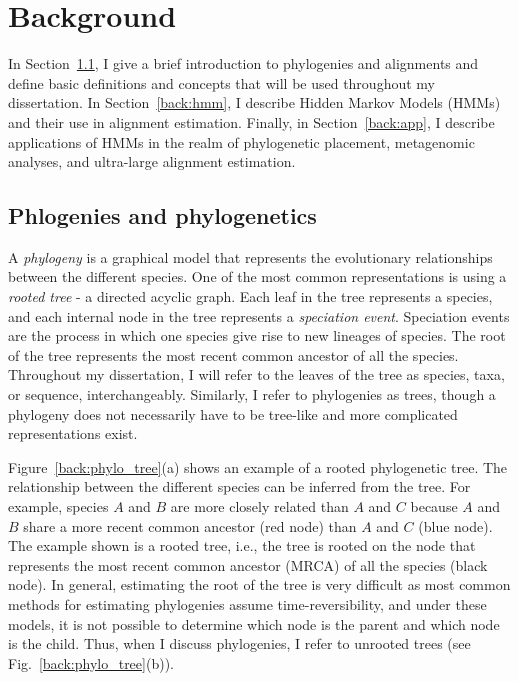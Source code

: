 \chapter{Background}
\label{background}%
In Section~\ref{back:phylogenetics}, I give a brief introduction to phylogenies and alignments and define basic definitions and concepts that will be used throughout my dissertation.  In Section~\ref{back:hmm}, I describe Hidden Markov Models (HMMs) and their use in alignment estimation. Finally, in Section~\ref{back:app}, I describe applications of HMMs in the realm of phylogenetic placement, metagenomic analyses, and ultra-large alignment estimation.

\section{Phlogenies and phylogenetics}\label{back:phylogenetics}
A \emph{phylogeny} is a graphical model that represents the evolutionary relationships between the different species.  One of the most common representations is using a \emph{rooted tree} - a directed acyclic graph.  Each leaf in the tree represents a species, and each internal node in the tree represents a \emph{speciation event}.  Speciation events are the process in which one species give rise to new lineages of species.  The root of the tree represents the most recent common ancestor of all the species.  Throughout my dissertation, I will refer to the leaves of the tree as species, taxa, or sequence, interchangeably.  Similarly, I refer to phylogenies as trees, though a phylogeny does not necessarily have to be tree-like and more complicated representations exist.

Figure~\ref{back:phylo_tree}(a) shows an example of a rooted phylogenetic tree.  The relationship between the different species can be inferred from the tree.  For example, species $A$ and $B$ are more closely related than $A$ and $C$ because $A$ and $B$ share a more recent common ancestor (red node) than $A$ and $C$ (blue node). The example shown is a rooted tree, i.e., the tree is rooted on the node that represents the most recent common ancestor (MRCA) of all the species (black node).  In general, estimating the root of the tree is very difficult as most common methods for estimating phylogenies assume time-reversibility, and under these models, it is not possible to determine which node is the parent and which node is the child.  Thus, when I discuss phylogenies, I refer to unrooted trees (see Fig.~\ref{back:phylo_tree}(b)).

